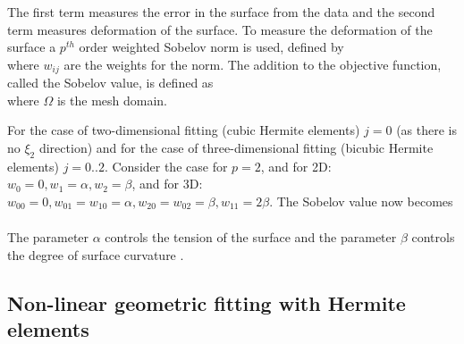 The first term measures the error in the surface from the data and the second
term measures deformation of the surface. To measure the deformation of the
surface a $p^{th}$ order weighted Sobelov norm 
\citep{terzopoulos:1986,tikhonov:1977} is used, defined by
\begin{equation}
  \label{eqn:Sobnorm}
\end{equation}
where $w_{ij}$ are the weights for the norm. The addition to the objective
function, called the Sobelov value, is defined as
\begin{equation}
  \label{eqn:Sobvalue}
\end{equation}
where $\Omega$ is the mesh domain.

For the case of two-dimensional fitting (\ie cubic Hermite elements) $j=0$
(as there is no $\xi_{2}$ direction) and for the case of three-dimensional
fitting (\ie bicubic Hermite elements) $j=0..2$. Consider the case for $p=2$,
and for 2D: $w_{0}=0, w_{1}=\alpha, w_{2}=\beta$, and for 3D: $w_{00}=0,
w_{01}=w_{10}=\alpha, w_{20}=w_{02}= \beta, w_{11}=2\beta$. The Sobelov value
now becomes
\begin{equation}
  \begin{array}{lllll}
  \end{array}
  \label{eqn:ptwoSobnorm}
\end{equation}

The parameter $\alpha$ controls the tension of the surface and the parameter
$\beta$ controls the degree of surface curvature
\citep{terzopoulos:1986}.

\subsection{Non-linear geometric fitting with Hermite elements}

